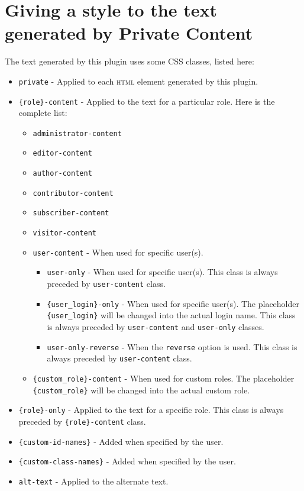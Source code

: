 \documentclass[a4paper,10pt]{article}
\begin{document}
\section{Giving a style to the text generated by Private Content}

The text generated by this plugin uses some CSS classes, listed here:

\begin{itemize}
 \item \verb+private+ - Applied to each \textsc{html} element generated by this plugin.
 \item \verb+{role}-content+ - Applied to the text for a particular role. Here is the complete list:
 \begin{itemize}
  \item \verb+administrator-content+
  \item \verb+editor-content+
  \item \verb+author-content+
  \item \verb+contributor-content+
  \item \verb+subscriber-content+
  \item \verb+visitor-content+
  \item \verb+user-content+ - When used for specific user(s).
  \begin{itemize}
   \item \verb+user-only+ - When used for specific user(s). This class is always preceded by \verb+user-content+ class.
    \item \verb+{user_login}-only+ - When used for specific user(s). The placeholder \verb+{user_login}+ will be changed into the actual login name. This class is always preceded by \verb+user-content+ and \verb+user-only+ classes.
    \item \verb+user-only-reverse+ - When the \verb+reverse+ option is used. This class is always preceded by \verb+user-content+ class.
  \end{itemize}
  \item \verb+{custom_role}-content+ - When used for custom roles. The placeholder \verb+{custom_role}+ will be changed into the actual custom role.
  \end{itemize}
 \item \verb+{role}-only+ - Applied to the text for a specific role. This class is always preceded by \verb+{role}-content+ class.
 \item \verb+{custom-id-names}+ - Added when specified by the user.
 \item \verb+{custom-class-names}+ - Added when specified by the user.
 \item \verb+alt-text+ - Applied to the alternate text.
\end{itemize}
\end{document}
